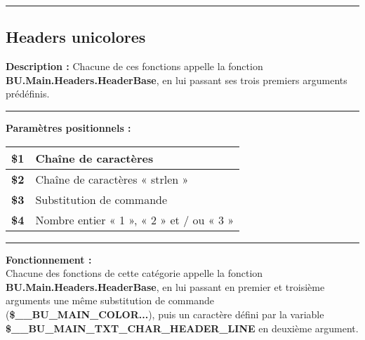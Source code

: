 \documentclass[a4paper,10pt]{article}
\begin{document}



    \color{sec2}\par\noindent\rule{\textwidth}{0.4pt}\color{text}

    \color{sec2}
    \subsection{Headers unicolores}\color{text}

    \begin{justify}
        \textbf{Description :}
        Chacune de ces fonctions appelle la fonction \textbf{\color{func}BU.Main.Headers.HeaderBase}, en lui passant ses trois premiers arguments prédéfinis.
    \end{justify}

    \par\noindent\rule{\textwidth}{0.4pt}

    \begin{justify}
        \textbf{Paramètres positionnels :}\\[1\baselineskip]
        \begin{tabular}{|l|l|}
            \hline
            \textbf{\color{vars}\$1} & Chaîne de caractères\\
            \hline
            \textbf{\color{vars}\$2} & Chaîne de caractères « strlen »\\
            \hline
            \textbf{\color{vars}\$3} & Substitution de commande\\
            \hline
            \textbf{\color{vars}\$4} & Nombre entier « 1 », « 2 » et / ou « 3 »\\
            \hline
        \end{tabular}
    \end{justify}

    \setlength{\parskip}{2em}
    \par\noindent\rule{\textwidth}{0.4pt}\setlength{\parskip}{1em}

    \begin{justify}
        \textbf{Fonctionnement :}\\[1\baselineskip]
        Chacune des fonctions de cette catégorie appelle la fonction \textbf{\color{func}BU.Main.Headers.HeaderBase}, en lui passant en premier et troisième arguments une même substitution de commande (\textbf{\color{vars}\$\_\_BU\_MAIN\_COLOR...}), puis un caractère défini par la variable \textbf{\color{vars}\$\_\_BU\_MAIN\_TXT\_CHAR\_HEADER\_LINE} en deuxième argument.
    \end{justify}
\end{document}
